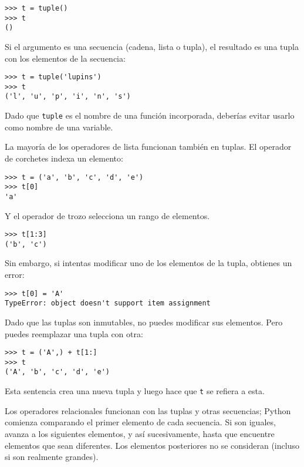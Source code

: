 \documentclass[10pt]{book}
\begin{document}
\begin{verbatim}
>>> t = tuple()
>>> t
()
\end{verbatim}
%
Si el argumento es una secuencia (cadena, lista o tupla), el resultado
es una tupla con los elementos de la secuencia:

\begin{verbatim}
>>> t = tuple('lupins')
>>> t
('l', 'u', 'p', 'i', 'n', 's')
\end{verbatim}
%
Dado que {\tt tuple} es el nombre de una función incorporada, deberías
evitar usarlo como nombre de una variable.

La mayoría de los operadores de lista funcionan también en tuplas.  El operador de corchetes
indexa un elemento:

\begin{verbatim}
>>> t = ('a', 'b', 'c', 'd', 'e')
>>> t[0]
'a'
\end{verbatim}
%
Y el operador de trozo selecciona un rango de elementos.

\begin{verbatim}
>>> t[1:3]
('b', 'c')
\end{verbatim}
%
Sin embargo, si intentas modificar uno de los elementos de la tupla, obtienes
un error:

\begin{verbatim}
>>> t[0] = 'A'
TypeError: object doesn't support item assignment
\end{verbatim}
%
Dado que las tuplas son inmutables, no puedes modificar sus elementos.  Pero
puedes reemplazar una tupla con otra:

\begin{verbatim}
>>> t = ('A',) + t[1:]
>>> t
('A', 'b', 'c', 'd', 'e')
\end{verbatim}
%
Esta sentencia crea una nueva tupla y luego hace que {\tt t} se refiera a esta.

Los operadores relacionales funcionan con las tuplas y otras secuencias;
Python comienza comparando el primer elemento de cada
secuencia.  Si son iguales, avanza a los siguientes elementos,
y así sucesivamente, hasta que encuentre elementos que sean diferentes.  Los elementos
posteriores no se consideran (incluso si son realmente grandes).
\end{document}
